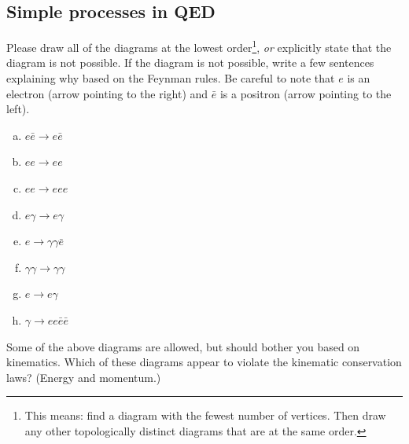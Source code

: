 \documentclass[12pt]{article}
\numberwithin{equation}{section}    %
\begin{document}
\subsection{Simple processes in QED}

Please draw all of the diagrams at the lowest order\footnote{This means: find a diagram with the fewest number of vertices. Then draw any other topologically distinct diagrams that are at the same order.}, \emph{or} explicitly state that the diagram is not possible. If the diagram is not possible, write a few sentences explaining why based on the Feynman rules. Be careful to note that $e$ is an electron (arrow pointing to the right) and $\bar e$ is a positron (arrow pointing to the left).

\begin{enumerate}[(a)]
\item $e\bar e \to e\bar e$
\item $ee \to ee$
\item $ee \to eee$
\item $e\gamma \to e\gamma$
\item $e \to \gamma \gamma \bar e$
\item $\gamma \gamma \to \gamma \gamma$
\item $e \to e \gamma$
\item $\gamma \to ee\bar e\bar e$
\end{enumerate}
Some of the above diagrams are allowed, but should bother you based on kinematics. Which of these diagrams appear to violate the kinematic conservation laws? (Energy and momentum.)
\end{document}
